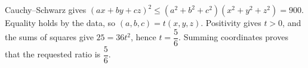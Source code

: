 Cauchy--Schwarz gives $(ax+by+cz)^2\le(a^2+b^2+c^2)(x^2+y^2+z^2)=900$. Equality holds by the data, so $(a,b,c)=t(x,y,z)$. Positivity gives $t>0$, and the sums of squares give $25=36t^2$, hence $t=\dfrac{5}{6}$. Summing coordinates proves that the requested ratio is $\boxed{\dfrac{5}{6}}$.
